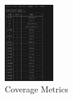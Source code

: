 \begin{figure}[h]
  \centering
  \includegraphics[width=0.19\textwidth]{./c3l2_img/run4.png}
  \caption{Coverage Metrics}
  \label{fig:run4}
\end{figure}

